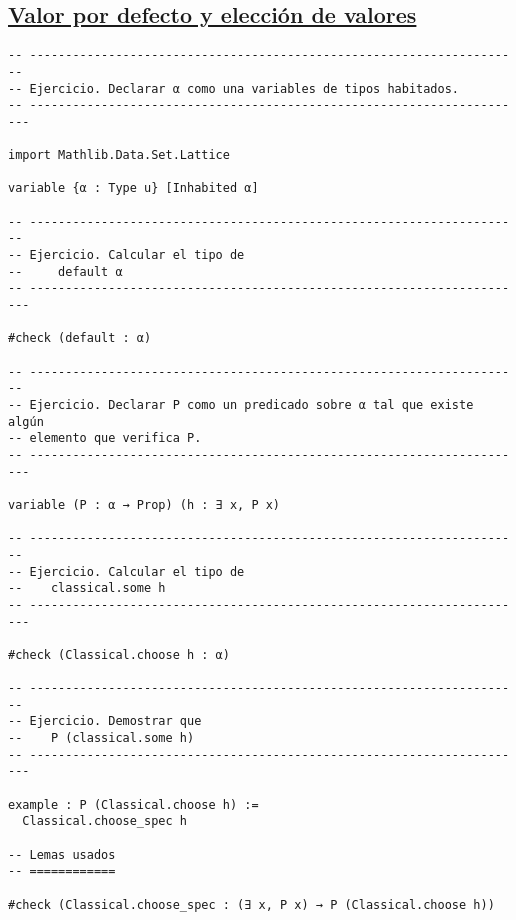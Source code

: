 \subsection{\href{./src/Conjuntos/Valor\_por\_defecto\_y\_eleccion\_de\_valores.lean}{Valor por defecto y elección de valores}}
\label{sec:org7a66407}
\begin{verbatim}
-- ---------------------------------------------------------------------
-- Ejercicio. Declarar α como una variables de tipos habitados.
-- ----------------------------------------------------------------------

import Mathlib.Data.Set.Lattice

variable {α : Type u} [Inhabited α]

-- ---------------------------------------------------------------------
-- Ejercicio. Calcular el tipo de
--     default α
-- ----------------------------------------------------------------------

#check (default : α)

-- ---------------------------------------------------------------------
-- Ejercicio. Declarar P como un predicado sobre α tal que existe algún
-- elemento que verifica P.
-- ----------------------------------------------------------------------

variable (P : α → Prop) (h : ∃ x, P x)

-- ---------------------------------------------------------------------
-- Ejercicio. Calcular el tipo de
--    classical.some h
-- ----------------------------------------------------------------------

#check (Classical.choose h : α)

-- ---------------------------------------------------------------------
-- Ejercicio. Demostrar que
--    P (classical.some h)
-- ----------------------------------------------------------------------

example : P (Classical.choose h) :=
  Classical.choose_spec h

-- Lemas usados
-- ============

#check (Classical.choose_spec : (∃ x, P x) → P (Classical.choose h))
\end{verbatim}

